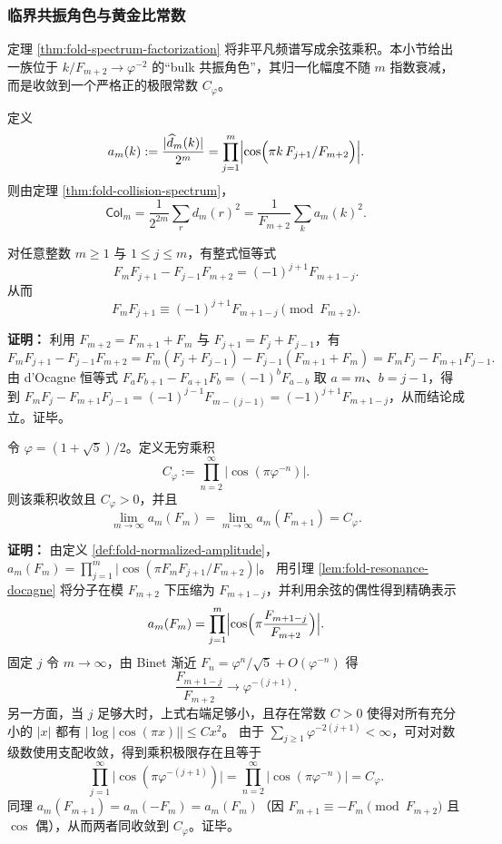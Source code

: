 \subsubsection{临界共振角色与黄金比常数}
\label{subsubsec:fold-critical-resonance}

定理 \ref{thm:fold-spectrum-factorization} 将非平凡频谱写成余弦乘积。本小节给出一族位于
\(
k/F_{m+2}\to \varphi^{-2}
\)
的“bulk 共振角色”，其归一化幅度不随 $m$ 指数衰减，而是收敛到一个严格正的极限常数 \(C_\varphi\)。

\begin{definition}[归一化频谱幅度]\label{def:fold-normalized-amplitude}
定义
\[
a_m(k):=\frac{|\widehat d_m(k)|}{2^m}
=\prod_{j=1}^m\Bigl|\cos\Bigl(\pi k\,F_{j+1}/F_{m+2}\Bigr)\Bigr|.
\]
则由定理 \ref{thm:fold-collision-spectrum}，
\[
\mathsf{Col}_m
=\frac{1}{2^{2m}}\sum_r d_m(r)^2
=\frac{1}{F_{m+2}}\sum_{k} a_m(k)^2.
\]
\end{definition}

\begin{lemma}\label{lem:fold-resonance-docagne}
对任意整数 \(m\ge 1\) 与 \(1\le j\le m\)，有整式恒等式
\[
F_mF_{j+1}-F_{j-1}F_{m+2}=(-1)^{j+1}F_{m+1-j}.
\]
从而
\[
F_mF_{j+1}\equiv (-1)^{j+1}F_{m+1-j}\pmod{F_{m+2}}.
\]
\end{lemma}

\textbf{证明：}
利用 \(F_{m+2}=F_{m+1}+F_m\) 与 \(F_{j+1}=F_j+F_{j-1}\)，有
\[
F_mF_{j+1}-F_{j-1}F_{m+2}
=F_m(F_j+F_{j-1})-F_{j-1}(F_{m+1}+F_m)
=F_mF_j-F_{m+1}F_{j-1}.
\]
由 d'Ocagne 恒等式
\(
F_aF_{b+1}-F_{a+1}F_b=(-1)^bF_{a-b}
\)
取 \(a=m\)、\(b=j-1\)，得到
\(
F_mF_j-F_{m+1}F_{j-1}=(-1)^{j-1}F_{m-(j-1)}=(-1)^{j+1}F_{m+1-j}
\)，从而结论成立。证毕。

\begin{theorem}\label{thm:fold-critical-resonance-constant}
令 \(\varphi=(1+\sqrt5)/2\)。定义无穷乘积
\[
C_\varphi:=\prod_{n=2}^{\infty}\bigl|\cos(\pi \varphi^{-n})\bigr|.
\]
则该乘积收敛且 \(C_\varphi>0\)，并且
\[
\lim_{m\to\infty}a_m(F_m)=\lim_{m\to\infty}a_m(F_{m+1})=C_\varphi.
\]
\end{theorem}

\textbf{证明：}
由定义 \ref{def:fold-normalized-amplitude}，
\(
a_m(F_m)=\prod_{j=1}^m\bigl|\cos(\pi F_mF_{j+1}/F_{m+2})\bigr|
\)。
用引理 \ref{lem:fold-resonance-docagne} 将分子在模 \(F_{m+2}\) 下压缩为 \(F_{m+1-j}\)，并利用余弦的偶性得到精确表示
\[
a_m(F_m)=\prod_{j=1}^m\Bigl|\cos\Bigl(\pi \frac{F_{m+1-j}}{F_{m+2}}\Bigr)\Bigr|.
\]
固定 \(j\) 令 \(m\to\infty\)，由 Binet 渐近 \(F_n=\varphi^n/\sqrt5+O(\varphi^{-n})\) 得
\[
\frac{F_{m+1-j}}{F_{m+2}}\to \varphi^{-(j+1)}.
\]
另一方面，当 \(j\) 足够大时，上式右端足够小，且存在常数 \(C>0\) 使得对所有充分小的 \(|x|\) 都有
\(
|\log|\cos(\pi x)||\le Cx^2
\)。
由于 \(\sum_{j\ge 1}\varphi^{-2(j+1)}<\infty\)，可对对数级数使用支配收敛，得到乘积极限存在且等于
\[
\prod_{j=1}^{\infty}\bigl|\cos(\pi \varphi^{-(j+1)})\bigr|
=\prod_{n=2}^{\infty}\bigl|\cos(\pi \varphi^{-n})\bigr|
=C_\varphi.
\]
同理 \(a_m(F_{m+1})=a_m(-F_m)=a_m(F_m)\)（因 \(F_{m+1}\equiv -F_m\pmod{F_{m+2}}\) 且 \(\cos\) 偶），从而两者同收敛到 \(C_\varphi\)。证毕。

